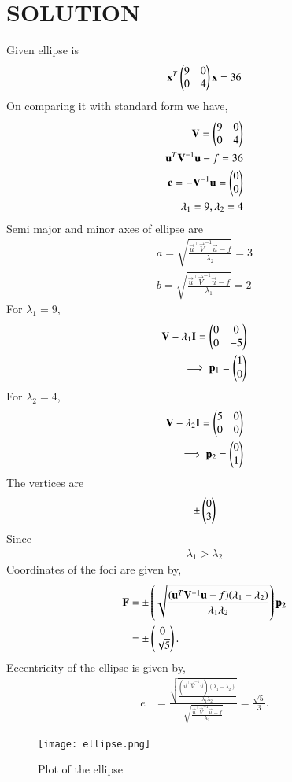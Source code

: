 \documentclass[journal,12pt,twocolumn]{IEEEtran}
\begin{document}
\section{SOLUTION}
%
Given ellipse is
\begin{align}
   \mathbf{x}^T\begin{pmatrix}9&0\\0&4\end{pmatrix}\mathbf{x}=36
\end{align}
%
On comparing it with standard form we have,
\begin{align}
    \mathbf{V} = \begin{pmatrix}9&0\\0&4\end{pmatrix}\\
    \mathbf{u}^T\mathbf{V}^{-1}\mathbf{u}-f = 36\\
    \mathbf{c} = -\mathbf{V}^{-1}\mathbf{u} = \begin{pmatrix}0\\0\end{pmatrix}\\
    \lambda_1 = 9, \lambda_2 = 4
\end{align}
Semi major and minor axes of ellipse are
\begin{align}
    a = \sqrt{\frac{\vec{u}^{\top}\vec{V}^{-1}\vec{u}-f}{\lambda_2}} = 3\\ 
    b = \sqrt{\frac{\vec{u}^{\top}\vec{V}^{-1}\vec{u}-f}{\lambda_1}} = 2
\end{align}
For $\lambda_1 = 9$,
\begin{align}
    \mathbf{V} - \lambda_1\mathbf{I} = \begin{pmatrix}0&0\\0&-5\end{pmatrix}\\
    \implies \mathbf{p}_1 = \begin{pmatrix}1\\0\end{pmatrix}
\end{align}
For $\lambda_2 = 4$,
\begin{align}
    \mathbf{V} - \lambda_2\mathbf{I} = \begin{pmatrix}5&0\\0&0\end{pmatrix}\\
    \implies \mathbf{p}_2 = \begin{pmatrix}0\\1\end{pmatrix}
\end{align}
The vertices are
\begin{align}
   \pm\begin{pmatrix}0 \\ 3\end{pmatrix} 
\end{align}
Since
\begin{align}
   \lambda_1 > \lambda_2
\end{align}
 Coordinates of the foci are given by,
\begin{align}
  \mathbf{F} &=\pm\left(\sqrt{\frac{(\mathbf{u}^T\mathbf{V}^{-1}\mathbf{u}-f)(\lambda_1-\lambda_2)}{\lambda_1\lambda_2}}\right)\mathbf{p_2} \\
  &= \pm\begin{pmatrix}0 \\ \sqrt{5}\end{pmatrix}.
\end{align}
Eccentricity of the ellipse is given by,
\begin{align}
   e &= \frac{\sqrt{\frac{(\vec{u}^{\top}\vec{V}^{-1}\vec{u})(\lambda_1-\lambda_2)}{\lambda_1\lambda_2}}}{\sqrt{\frac{\vec{u}^{\top}\vec{V}^{-1}\vec{u}-f}{\lambda_2}}} 
   = \frac{\sqrt{5}}{3}.
\end{align}

\begin{figure}[ht]
\centering
\texttt{[image: ellipse.png]}
\caption{Plot of the ellipse}
\label{Plot of the ellipse}
\end{figure}
\end{document}
